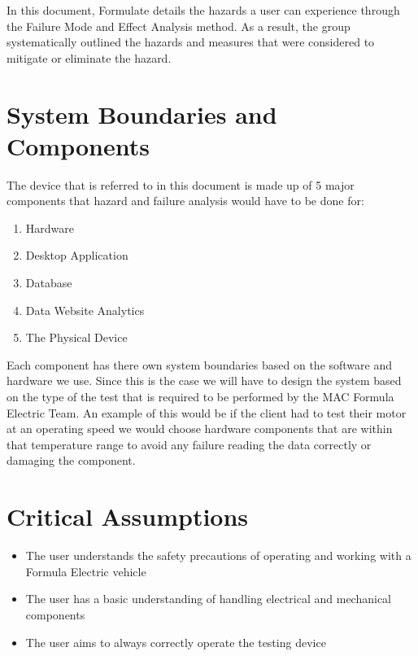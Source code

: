 \documentclass{article}
\begin{document}
In this document, Formulate details the hazards a user can experience through the Failure Mode and Effect Analysis method. As a result, the group systematically outlined the hazards and measures that were considered to mitigate or eliminate the hazard.

\section{System Boundaries and Components}

The device that is referred to in this document is made up of 5 major components that hazard and failure analysis would have to be done for:

\begin{enumerate}
\item Hardware
\item Desktop Application
\item Database
\item Data Website Analytics
\item The Physical Device
\end{enumerate}

Each component has there own system boundaries based on the software and hardware we use. Since this is the case we will have to design the system based on the type of the test that is required to be performed by the MAC Formula Electric Team. An example of this would be if the client had to test their motor at an operating speed we would choose hardware components that are within that temperature range to avoid any failure reading the data correctly or damaging the component.

\section{Critical Assumptions}

\begin{itemize}
	\item The user understands the safety precautions of operating and working with a Formula Electric vehicle
	\item The user has a basic understanding of handling electrical and mechanical components
	\item The user aims to always correctly operate the testing device
\end{itemize}

\end{document}
